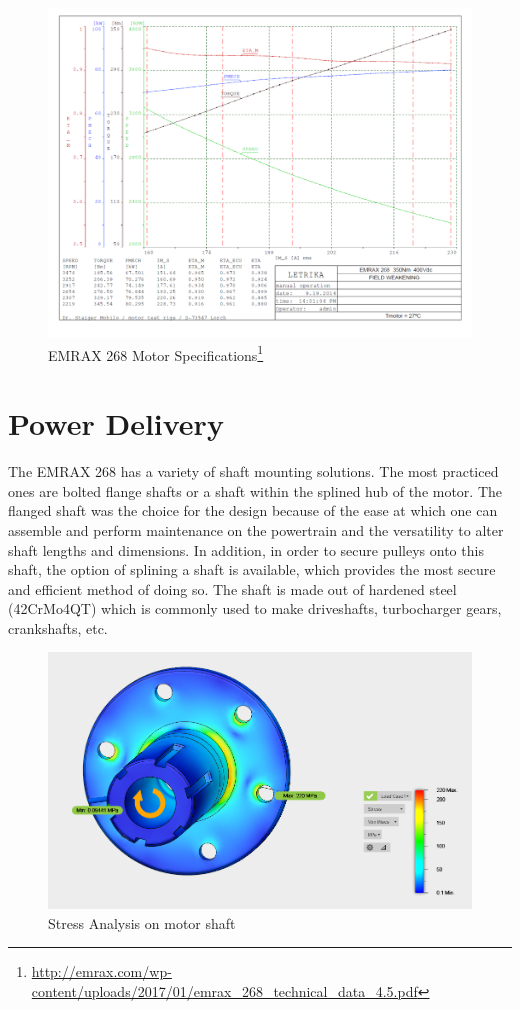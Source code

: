 \documentclass[main.tex]{subfiles}
\begin{document}
    \begin{figure}[H]
        \centering
        \includegraphics[width=\linewidth]{images/fig11}
        \caption{EMRAX 268 Motor Specifications\protect\footnote{\url{http://emrax.com/wp-content/uploads/2017/01/emrax_268_technical_data_4.5.pdf}}}
    \end{figure}
    
    \section{Power Delivery}
    The EMRAX 268 has a variety of shaft mounting solutions. The most practiced ones are bolted flange shafts or a shaft within the splined hub of the motor. The flanged shaft was the choice for the design because of the ease at which one can assemble and perform maintenance on the powertrain and the versatility to alter shaft lengths and dimensions. In addition, in order to secure pulleys onto this shaft, the option of splining a shaft is available, which provides the most secure and efficient method of doing so. The shaft is made out of hardened steel (42CrMo4QT) which is commonly used to make driveshafts, turbocharger gears, crankshafts, etc.\\

    \begin{figure}[H]
        \centering
        \includegraphics[width=\linewidth]{images/fig12}
        \caption{Stress Analysis on motor shaft}
    \end{figure}
\end{document}
